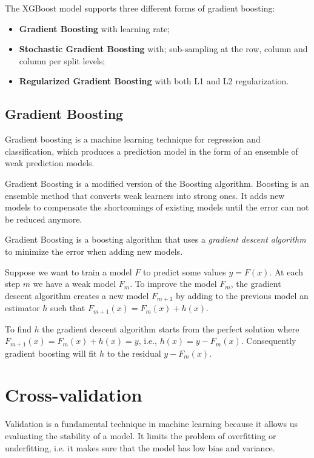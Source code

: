 The XGBoost model supports three different forms of gradient boosting: \cite{gentleXgboost}
\begin{itemize}
	\item \textbf{Gradient Boosting} with learning rate;
	\item \textbf{Stochastic Gradient Boosting} with; sub-sampling at the row, column and column per split levels;
	\item \textbf{Regularized Gradient Boosting} with both L1 and L2 regularization.
\end{itemize} 

\subsection{Gradient Boosting}

Gradient boosting is a machine learning technique for regression and classification, which produces a prediction model in the form of an ensemble of weak prediction models. 

Gradient Boosting is a modified version of the Boosting algorithm.
Boosting is an ensemble method that converts weak learners into strong ones. It adds new models to compensate the shortcomings of existing models until the error can not be reduced anymore. \cite{zhou2012ensemble}

Gradient Boosting is a boosting algorithm that uses a \textit{gradient descent algorithm} to minimize the error when adding new models.

Suppose we want to train a model $F$ to predict some values $y = F(x)$. At each step $m$ we have a weak model $F_m$. To improve the model $F_m$, the gradient descent algorithm creates a new model $F_{m+1}$ by adding to the previous model an estimator $h$ such that $F_{m+1}(x) = F_m(x) + h(x)$. \cite{gradientBoostLi}

To find $h$ the gradient descent algorithm starts from the perfect solution where $F_{m+1}(x) = F_m(x) + h(x) = y$, i.e., $h(x) = y - F_m(x)$. Consequently gradient boosting will fit $h$ to the residual $y - F_m(x)$.


\section{Cross-validation}
\label{sec:cv}

Validation is a fundamental technique in machine learning because it allows us evaluating the stability of a model. It limits the problem of overfitting or underfitting, i.e. it makes sure that  the model has low bias and variance.

